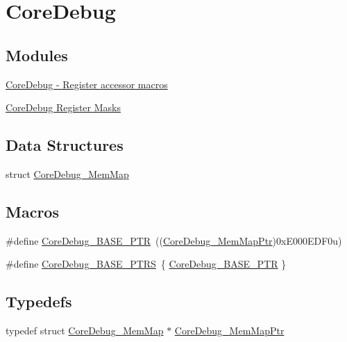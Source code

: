 \hypertarget{group___core_debug___peripheral}{}\section{Core\+Debug}
\label{group___core_debug___peripheral}
\subsection*{Modules}
\begin{DoxyCompactItemize}
\item 
\hyperlink{group___core_debug___register___accessor___macros}{Core\+Debug -\/ Register accessor macros}
\item 
\hyperlink{group___core_debug___register___masks}{Core\+Debug Register Masks}
\end{DoxyCompactItemize}
\subsection*{Data Structures}
\begin{DoxyCompactItemize}
\item 
struct \hyperlink{struct_core_debug___mem_map}{Core\+Debug\+\_\+\+Mem\+Map}
\end{DoxyCompactItemize}
\subsection*{Macros}
\begin{DoxyCompactItemize}
\item 
\#define \hyperlink{group___core_debug___peripheral_ga994a185afca30ede538d89322c4f0326}{Core\+Debug\+\_\+\+B\+A\+S\+E\+\_\+\+P\+TR}~((\hyperlink{group___core_debug___peripheral_gaa548220bc91b12bd49065fe752579fcd}{Core\+Debug\+\_\+\+Mem\+Map\+Ptr})0x\+E000\+E\+D\+F0u)
\item 
\#define \hyperlink{group___core_debug___peripheral_gaceec19d257d8b9f9bff5d47d285dec27}{Core\+Debug\+\_\+\+B\+A\+S\+E\+\_\+\+P\+T\+RS}~\{ \hyperlink{group___core_debug___peripheral_ga994a185afca30ede538d89322c4f0326}{Core\+Debug\+\_\+\+B\+A\+S\+E\+\_\+\+P\+TR} \}
\end{DoxyCompactItemize}
\subsection*{Typedefs}
\begin{DoxyCompactItemize}
\item 
typedef struct \hyperlink{struct_core_debug___mem_map}{Core\+Debug\+\_\+\+Mem\+Map} $\ast$ \hyperlink{group___core_debug___peripheral_gaa548220bc91b12bd49065fe752579fcd}{Core\+Debug\+\_\+\+Mem\+Map\+Ptr}
\end{DoxyCompactItemize}


